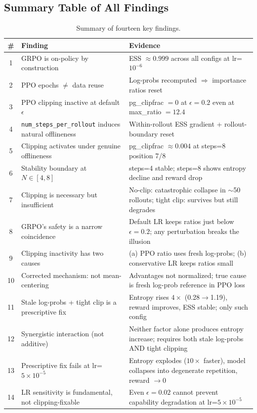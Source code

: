 \documentclass[11pt,a4paper]{article}
\begin{document}
\subsection{Summary Table of All Findings}

\begin{table}[H]
\centering
\caption{Summary of fourteen key findings.}
\label{tab:findings_summary}
\begin{tabular}{@{}clp{7.5cm}@{}}
\toprule
\textbf{\#} & \textbf{Finding} & \textbf{Evidence} \\
\midrule
1 & GRPO is on-policy by construction & ESS $\approx 0.999$ across all configs at lr=$10^{-6}$ \\
2 & PPO epochs $\neq$ data reuse & Log-probs recomputed $\Rightarrow$ importance ratios reset \\
3 & PPO clipping inactive at default $\epsilon$ & pg\_clipfrac $= 0$ at $\epsilon = 0.2$ even at max\_ratio $= 12.4$ \\
4 & \texttt{num\_steps\_per\_rollout} induces natural offlineness & Within-rollout ESS gradient + rollout-boundary reset \\
5 & Clipping activates under genuine offlineness & pg\_clipfrac $\approx 0.004$ at steps=8 position 7/8 \\
6 & Stability boundary at $N \in [4, 8]$ & steps=4 stable; steps=8 shows entropy decline and reward drop \\
7 & Clipping is necessary but insufficient & No-clip: catastrophic collapse in $\sim$50 rollouts; tight clip: survives but still degrades \\
8 & GRPO's safety is a narrow coincidence & Default LR keeps ratios just below $\epsilon = 0.2$; any perturbation breaks the illusion \\
9 & Clipping inactivity has two causes & (a) PPO ratio uses fresh log-probs; (b) conservative LR keeps ratios small \\
10 & Corrected mechanism: not mean-centering & Advantages not normalized; true cause is fresh log-prob reference in PPO loss \\
11 & Stale log-probs + tight clip is a prescriptive fix & Entropy rises $4\times$ (0.28$\to$1.19), reward improves, ESS stable; only such config \\
12 & Synergistic interaction (not additive) & Neither factor alone produces entropy increase; requires both stale log-probs AND tight clipping \\
13 & Prescriptive fix fails at lr=$5 \times 10^{-5}$ & Entropy explodes ($10\times$ faster), model collapses into degenerate repetition, reward $\to 0$ \\
14 & LR sensitivity is fundamental, not clipping-fixable & Even $\epsilon = 0.02$ cannot prevent capability degradation at lr=$5 \times 10^{-5}$ \\
\bottomrule
\end{tabular}
\end{table}
\end{document}

